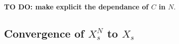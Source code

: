 \documentclass{article}[12pt]
\begin{document}
    \textbf{TO DO: make explicit the dependance of $C$ in $N$}.
    
    \subsection{Convergence of $X_s^{N}$ to $X_s$}
    


    
\end{document}
